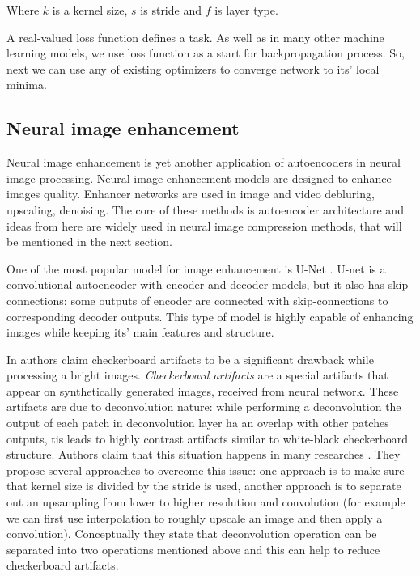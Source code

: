 Where $k$ is a kernel size, $s$ is stride and $f$ is layer type.

A real-valued loss function defines a task. As well as in many other machine learning models, we use loss function as a start for backpropagation process. So, next we can use any of existing optimizers to converge network to its' local minima.

\subsection{Neural image enhancement}

Neural image enhancement is yet another application of autoencoders in neural image processing. Neural image enhancement models are designed to enhance images quality. Enhancer networks are used in image and video debluring, upscaling, denoising. The core of these methods is autoencoder architecture and ideas from here are widely used in neural image compression methods, that will be mentioned in the next section.

One of the most popular model for image enhancement is U-Net \cite{ronneberger_u-net_2015}. U-net is a convolutional autoencoder with encoder and decoder models, but it also has skip connections: some outputs of encoder are connected with skip-connections to corresponding decoder outputs. This type of model is highly capable of enhancing images while keeping its' main features and structure.

In \cite{odena_deconvolution_2016} authors claim checkerboard artifacts to be a significant drawback while processing a bright images. \textit{Checkerboard artifacts} are a special artifacts that appear on synthetically generated images, received from neural network. These artifacts are due to deconvolution nature: while performing a deconvolution the output of each patch in deconvolution layer ha an overlap with other patches outputs, tis leads to highly contrast artifacts similar to white-black checkerboard structure. Authors claim that this situation happens in many researches \cite{dumoulin_adversarially_2017,donahue_adversarial_2017,salimans_improved_2016,radford_unsupervised_2016}. They propose several approaches to overcome this issue: one approach is to make sure that kernel size is divided by the stride is used, another approach is to separate out an upsampling from lower to higher resolution and convolution (for example we can first use interpolation to roughly upscale an image and then apply a convolution). Conceptually they state that deconvolution operation can be separated into two operations mentioned above and this can help to reduce checkerboard artifacts.

